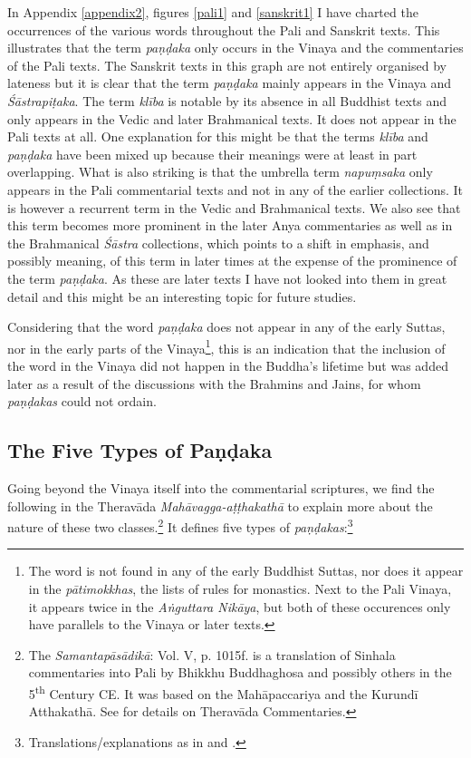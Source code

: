 In Appendix \ref{appendix2}, figures \ref{pali1} and \ref{sanskrit1} I have charted the occurrences of the various words throughout the Pali and Sanskrit texts. This illustrates that the term {\em paṇḍaka} only occurs in the Vinaya and the commentaries of the Pali texts. The Sanskrit texts in this graph are not entirely organised by lateness but it is clear that the term {\em paṇḍaka} mainly appears in the Vinaya and {\em Śāstrapiṭaka}. The term {\em klība} is notable by its absence in all Buddhist texts and only appears in the Vedic and later Brahmanical texts. It does not appear in the Pali texts at all. One explanation for this might be that the terms {\em klība} and {\em paṇḍaka} have been mixed up because their meanings were at least in part overlapping. What is also striking is that the umbrella term {\em napuṃsaka} only appears in the Pali commentarial texts and not in any of the earlier collections. It is however a recurrent term in the Vedic and Brahmanical texts. We also see that this term becomes more prominent in the later Anya commentaries as well as in the Brahmanical {\em Śāstra} collections, which points to a shift in emphasis, and possibly meaning, of this term in later times at the expense of the prominence of the term {\em paṇḍaka}. As these are later texts I have not looked into them in great detail and this might be an interesting topic for future studies.

Considering that the word {\em paṇḍaka} does not appear in any of the early Suttas, nor in the early parts of the Vinaya\footnote{The word is not found in any of the early Buddhist Suttas, nor does it appear in the {\em pātimokkhas}, the lists of rules for monastics. Next to the Pali Vinaya, it appears twice in the {\em Aṅguttara Nikāya}, but both of these occurences only have parallels to the Vinaya or later texts.}, this is an indication that the inclusion of the word in the Vinaya did not happen in the Buddha's lifetime but was added later as a result of the discussions with the Brahmins and Jains, for whom {\em paṇḍakas} could not ordain.

\subsection{The Five Types of Paṇḍaka}
Going beyond the Vinaya itself into the commentarial scriptures, we find the following in the Theravāda {\em Mahāvagga-aṭṭhakathā} to explain more about the nature of these two classes.\footnote{The {\em Samantapāsādikā}: Vol. V, p. 1015f. is a translation of Sinhala commentaries into Pali by Bhikkhu Buddhaghosa and possibly others in the 5\textsuperscript{th} Century CE. It was based on the Mahāpaccariya and the Kurundī Atthakathā. See \cite{goonesekere} for details on Theravāda Commentaries.} It defines five types of {\em paṇḍakas}:\footnote{Translations/explanations as in \cite{bomhard} and \cite{thanissaro}.}

